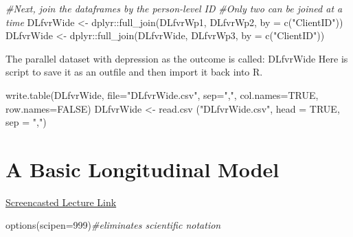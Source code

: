 \documentclass[
  11pt,
]{book}
\newenvironment{Shaded}{\begin{snugshade}}{\end{snugshade}}
\newcommand{\AttributeTok}[1]{\textcolor[rgb]{0.77,0.63,0.00}{#1}}
\newcommand{\CommentTok}[1]{\textcolor[rgb]{0.56,0.35,0.01}{\textit{#1}}}
\newcommand{\ConstantTok}[1]{\textcolor[rgb]{0.00,0.00,0.00}{#1}}
\newcommand{\DecValTok}[1]{\textcolor[rgb]{0.00,0.00,0.81}{#1}}
\newcommand{\FunctionTok}[1]{\textcolor[rgb]{0.00,0.00,0.00}{#1}}
\newcommand{\NormalTok}[1]{#1}
\newcommand{\OtherTok}[1]{\textcolor[rgb]{0.56,0.35,0.01}{#1}}
\newcommand{\SpecialCharTok}[1]{\textcolor[rgb]{0.00,0.00,0.00}{#1}}
\newcommand{\StringTok}[1]{\textcolor[rgb]{0.31,0.60,0.02}{#1}}
\begin{document}
\begin{Shaded}
\begin{Highlighting}[]
\CommentTok{\#Next, join the dataframes by the person{-}level ID}
\CommentTok{\#Only two can be joined at a time}
\NormalTok{DLfvrWide }\OtherTok{\textless{}{-}}\NormalTok{ dplyr}\SpecialCharTok{::}\FunctionTok{full\_join}\NormalTok{(DLfvrWp1, DLfvrWp2, }\AttributeTok{by =} \FunctionTok{c}\NormalTok{(}\StringTok{"ClientID"}\NormalTok{))}
\NormalTok{DLfvrWide }\OtherTok{\textless{}{-}}\NormalTok{ dplyr}\SpecialCharTok{::}\FunctionTok{full\_join}\NormalTok{(DLfvrWide, DLfvrWp3,  }\AttributeTok{by =} \FunctionTok{c}\NormalTok{(}\StringTok{"ClientID"}\NormalTok{))}
\end{Highlighting}
\end{Shaded}

The parallel dataset with depression as the outcome is called: DLfvrWide Here is script to save it as an outfile and then import it back into R.

\begin{Shaded}
\begin{Highlighting}[]
\FunctionTok{write.table}\NormalTok{(DLfvrWide, }\AttributeTok{file=}\StringTok{"DLfvrWide.csv"}\NormalTok{, }\AttributeTok{sep=}\StringTok{","}\NormalTok{, }\AttributeTok{col.names=}\ConstantTok{TRUE}\NormalTok{, }\AttributeTok{row.names=}\ConstantTok{FALSE}\NormalTok{)}
\NormalTok{DLfvrWide }\OtherTok{\textless{}{-}} \FunctionTok{read.csv}\NormalTok{ (}\StringTok{"DLfvrWide.csv"}\NormalTok{, }\AttributeTok{head =} \ConstantTok{TRUE}\NormalTok{, }\AttributeTok{sep =} \StringTok{","}\NormalTok{)}
\end{Highlighting}
\end{Shaded}

\hypertarget{LongMod}{%
\chapter{A Basic Longitudinal Model}\label{LongMod}}

\href{https://spu.hosted.panopto.com/Panopto/Pages/Viewer.aspx?pid=dedb85c8-e442-49bf-8f92-ad31018b1dd8}{Screencasted Lecture Link}

\begin{Shaded}
\begin{Highlighting}[]
\FunctionTok{options}\NormalTok{(}\AttributeTok{scipen=}\DecValTok{999}\NormalTok{)}\CommentTok{\#eliminates scientific notation}
\end{Highlighting}
\end{Shaded}
\end{document}
